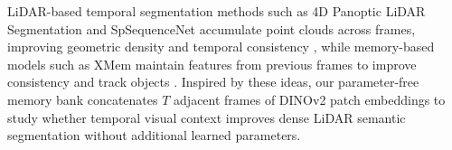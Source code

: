 \documentclass[10pt,twocolumn,letterpaper]{article}
\begin{document}
LiDAR-based temporal segmentation methods such as 4D Panoptic LiDAR Segmentation and SpSequenceNet accumulate point clouds across frames, improving geometric density and temporal consistency \cite{aygün20214dpanopticlidarsegmentation, 9156504}, while memory-based models such as XMem maintain features from previous frames to improve consistency and track objects \cite{cheng2022xmemlongtermvideoobject}. Inspired by these ideas, our parameter-free memory bank concatenates $T$ adjacent frames of DINOv2 patch embeddings to study whether temporal visual context improves dense LiDAR semantic segmentation without additional learned parameters.
\end{document}
